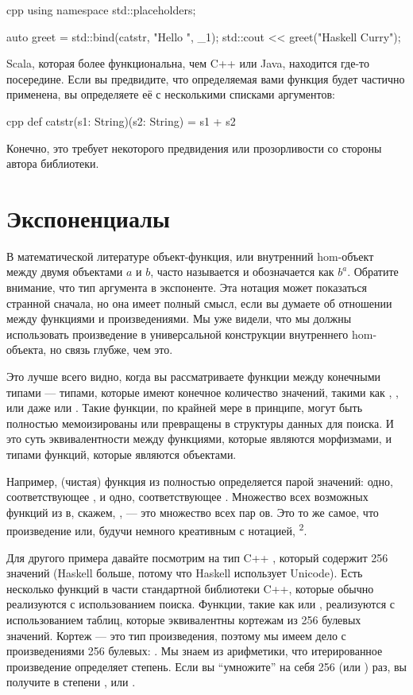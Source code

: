\begin{snip}{cpp}
using namespace std::placeholders;

auto greet = std::bind(catstr, "Hello ", _1);
std::cout << greet("Haskell Curry");
\end{snip}
Scala, которая более функциональна, чем C++ или Java, находится где-то
посередине. Если вы предвидите, что определяемая вами функция будет
частично применена, вы определяете её с несколькими списками аргументов:

\begin{snip}{cpp}
def catstr(s1: String)(s2: String) = s1 + s2
\end{snip}
Конечно, это требует некоторого предвидения или прозорливости со стороны
автора библиотеки.

\section{Экспоненциалы}

В математической литературе объект-функция, или внутренний
hom-объект между двумя объектами $a$ и $b$, часто
называется  и обозначается как $b^{a}$. Обратите внимание, что
тип аргумента в экспоненте. Эта нотация может показаться странной
сначала, но она имеет полный смысл, если вы думаете об отношении
между функциями и произведениями. Мы уже видели, что мы должны использовать
произведение в универсальной конструкции внутреннего hom-объекта,
но связь глубже, чем это.

Это лучше всего видно, когда вы рассматриваете функции между конечными типами ---
типами, которые имеют конечное количество значений, такими как ,
, или даже  или . Такие функции,
по крайней мере в принципе, могут быть полностью мемоизированы или превращены в структуры данных
для поиска. И это суть эквивалентности
между функциями, которые являются морфизмами, и типами функций, которые являются
объектами.

Например, (чистая) функция из  полностью
определяется парой значений: одно, соответствующее , и
одно, соответствующее . Множество всех возможных функций
из  в, скажем, , --- это множество всех пар
ов. Это то же самое, что произведение  \times{}  или,
будучи немного креативным с нотацией, \textsuperscript{2}.

Для другого примера давайте посмотрим на тип C++ , который
содержит 256 значений (Haskell  больше, потому что Haskell
использует Unicode). Есть несколько функций в части
стандартной библиотеки C++, которые обычно реализуются с использованием поиска.
Функции, такие как  или , реализуются
с использованием таблиц, которые эквивалентны кортежам из 256 булевых значений.
Кортеж --- это тип произведения, поэтому мы имеем дело с произведениями 256
булевых: . Мы знаем из
арифметики, что итерированное произведение определяет степень. Если вы
``умножите''  на себя 256 (или ) раз, вы
получите  в степени , или \textsuperscript{}.

